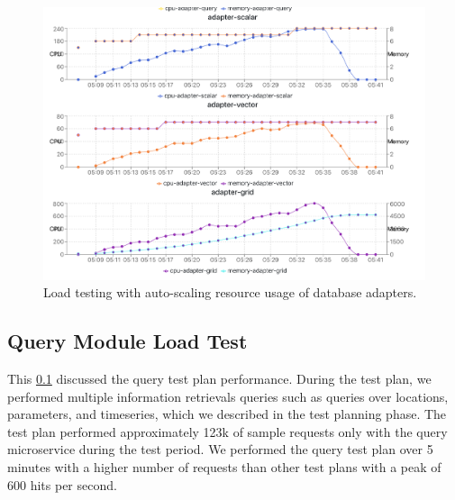 \begin{figure}[htp]
    \centering
    \includegraphics[width=1.0\textwidth]{results/obs/all_auto/obs_all_auto_15m_adapter_dbs_res.png}
    \caption{Load testing with auto-scaling resource usage of database adapters.}
    \label{fi:obs_all_auto_15m_adapter_dbs_res}
\end{figure}


\subsection{Query Module Load Test}
\label{subse:obs_test_plan_query_15min}

This \cref{subse:obs_test_plan_query_15min} discussed the query test plan performance. During the test plan, we performed multiple information retrievals queries such as queries over locations, parameters, and timeseries, which we described in the test planning phase. The test plan performed approximately 123k of sample requests only with the query microservice during the test period. We performed the query test plan over 5 minutes with a higher number of requests than other test plans with a peak of 600 hits per second.

